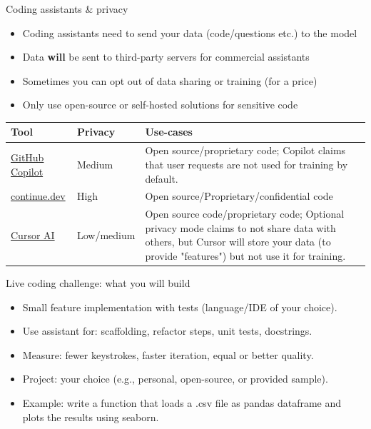 \documentclass[
  aspectratio=1610,
]{beamer}
\begin{document}
\begin{frame}{Coding assistants \& privacy}
  \begin{itemize}
    \item Coding assistants need to send your data (code/questions etc.) to the model
    \item Data \textbf{will} be sent to third-party servers for commercial assistants
    \item Sometimes you can opt out of data sharing or training (for a price)
    \item Only use open-source or self-hosted solutions for sensitive code
  \end{itemize}
  \vspace{0.5em}
  \begin{tabularx}{\linewidth}{@{} l l X @{}}
    \toprule
    \textbf{Tool}                                              & \textbf{Privacy} & \textbf{Use-cases}                                                                                                                                                                  \\
    \midrule
    \href{https://github.com/features/copilot}{GitHub Copilot} & Medium           & Open source/proprietary code; Copilot claims that user requests are not used for training by default.                                                                               \\
    \href{https://continue.dev}{continue.dev}                  & High             & Open source/Proprietary/confidential code                                                                                                                                           \\
    \href{https://cursor.com}{Cursor AI}                       & Low/medium       & Open source code/proprietary code; Optional privacy mode claims to not share data with others, but Cursor will store your data (to provide "features") but not use it for training. \\
    \bottomrule
  \end{tabularx}
\end{frame}


\begin{frame}{Live coding challenge: what you will build}
  \begin{itemize}
    \item Small feature implementation with tests (language/IDE of your choice).
    \item Use assistant for: scaffolding, refactor steps, unit tests, docstrings.
    \item Measure: fewer keystrokes, faster iteration, equal or better quality.
    \item Project: your choice (e.g., personal, open-source, or provided sample).
    \item Example: write a function that loads a .csv file as pandas dataframe and plots the results using seaborn.
  \end{itemize}
\end{frame}
\end{document}
